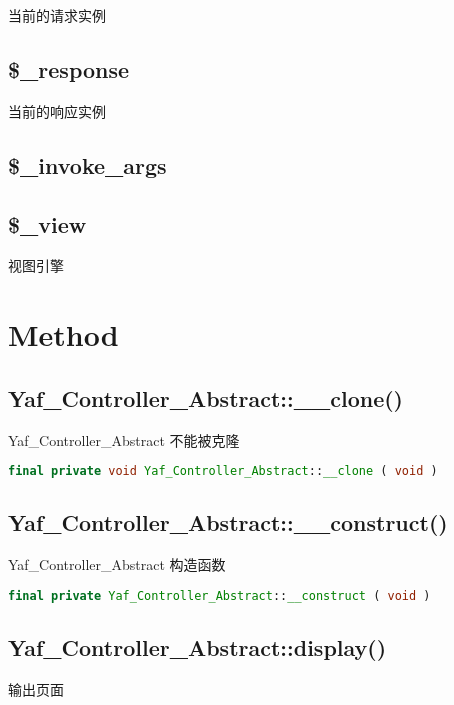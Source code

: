 当前的请求实例


\subsection{\$\_response}

当前的响应实例


\subsection{\$\_invoke\_args}



\subsection{\$\_view}

视图引擎


\section{Method}


\subsection{Yaf\_Controller\_Abstract::\_\_clone()}


Yaf\_Controller\_Abstract 不能被克隆


\begin{lstlisting}[language=PHP]
final private void Yaf_Controller_Abstract::__clone ( void )
\end{lstlisting}


\subsection{Yaf\_Controller\_Abstract::\_\_construct()}

Yaf\_Controller\_Abstract 构造函数


\begin{lstlisting}[language=PHP]
final private Yaf_Controller_Abstract::__construct ( void )
\end{lstlisting}


\subsection{Yaf\_Controller\_Abstract::display()}


输出页面





